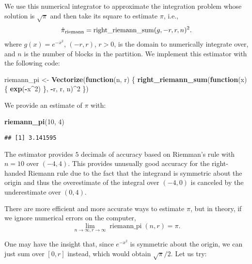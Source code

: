 \documentclass[
  12pt,
]{paper}
\newenvironment{Shaded}{\begin{snugshade}}{\end{snugshade}}
\newcommand{\ControlFlowTok}[1]{\textcolor[rgb]{0.13,0.29,0.53}{\textbf{#1}}}
\newcommand{\DecValTok}[1]{\textcolor[rgb]{0.00,0.00,0.81}{#1}}
\newcommand{\FunctionTok}[1]{\textcolor[rgb]{0.13,0.29,0.53}{\textbf{#1}}}
\newcommand{\NormalTok}[1]{#1}
\newcommand{\OtherTok}[1]{\textcolor[rgb]{0.56,0.35,0.01}{#1}}
\newcommand{\SpecialCharTok}[1]{\textcolor[rgb]{0.81,0.36,0.00}{\textbf{#1}}}
\begin{document}
We use this numerical integrator to approximate the integration problem
whose solution is \(\sqrt{\pi}\) and then take its square to estimate
\(\pi\), i.e., \[
  \hat{\pi}_{\rm{riemann}} = \operatorname{right\_riemann\_sum}(g,-r,r,n)^2.
\] where \(g(x) = e^{-x^2}\), \((-r,r)\), \(r > 0\), is the domain to
numerically integrate over, and \(n\) is the number of blocks in the
partition. We implement this estimator with the following code:

\begin{Shaded}
\begin{Highlighting}[]
\NormalTok{riemann\_pi }\OtherTok{\textless{}{-}} \FunctionTok{Vectorize}\NormalTok{(}\ControlFlowTok{function}\NormalTok{(n, r) \{}
    \FunctionTok{right\_riemann\_sum}\NormalTok{(}\ControlFlowTok{function}\NormalTok{(x) \{}
        \FunctionTok{exp}\NormalTok{(}\SpecialCharTok{{-}}\NormalTok{x}\SpecialCharTok{\^{}}\DecValTok{2}\NormalTok{)}
\NormalTok{    \}, }\SpecialCharTok{{-}}\NormalTok{r, r, n)}\SpecialCharTok{\^{}}\DecValTok{2}
\NormalTok{\})}
\end{Highlighting}
\end{Shaded}

We provide an estimate of \(\pi\) with:

\begin{Shaded}
\begin{Highlighting}[]
\FunctionTok{riemann\_pi}\NormalTok{(}\DecValTok{10}\NormalTok{, }\DecValTok{4}\NormalTok{)}
\end{Highlighting}
\end{Shaded}

\begin{verbatim}
## [1] 3.141595
\end{verbatim}

The estimator provides \(5\) decimals of accuracy based on Riemman's
rule with \(n = 10\) over \((-4,4)\). This provides unusually good
accuracy for the right-handed Riemann rule due to the fact that the
integrand is symmetric about the origin and thus the overestimate of the
integral over \((-4,0)\) is canceled by the underestimate over
\((0,4)\).

There are more efficient and more accurate ways to estimate \(\pi\), but
in theory, if we ignore numerical errors on the computer, \[
  \lim_{n\to\infty,r \to \infty} \operatorname{riemann\_pi}(n,r) = \pi.
\]

One may have the insight that, since \(e^{-x^2}\) is symmetric about the
origin, we can just sum over \([0,r]\) instead, which would obtain
\(\sqrt{\pi}/2\). Let us try:
\end{document}
